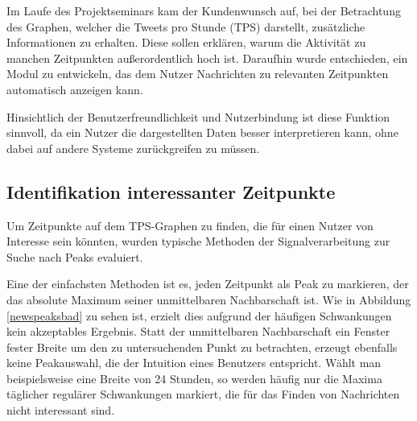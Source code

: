 \label{sec:news}
Im Laufe des Projektseminars kam der Kundenwunsch auf, bei der Betrachtung des Graphen, welcher die Tweets pro Stunde (TPS) darstellt, zusätzliche Informationen zu erhalten. Diese sollen erklären, warum die Aktivität zu manchen Zeitpunkten außerordentlich hoch ist. Daraufhin wurde entschieden, ein Modul zu entwickeln, das dem Nutzer Nachrichten zu relevanten Zeitpunkten automatisch anzeigen kann. 

Hinsichtlich der Benutzerfreundlichkeit und Nutzerbindung ist diese Funktion sinnvoll, da ein Nutzer die dargestellten Daten besser interpretieren kann, ohne dabei auf andere Systeme zurückgreifen zu müssen.

\subsection{Identifikation interessanter Zeitpunkte}
Um Zeitpunkte auf dem TPS-Graphen zu finden, die für einen Nutzer von Interesse sein könnten, wurden typische Methoden der Signalverarbeitung zur Suche nach Peaks evaluiert.

Eine der einfachsten Methoden ist es, jeden Zeitpunkt als Peak zu markieren, der das absolute Maximum seiner unmittelbaren Nachbarschaft ist. Wie in Abbildung \ref{newspeaksbad} zu sehen ist, erzielt dies aufgrund der häufigen Schwankungen kein akzeptables Ergebnis. Statt der unmittelbaren Nachbarschaft ein Fenster fester Breite um den zu untersuchenden Punkt zu betrachten, erzeugt ebenfalls keine Peakauswahl, die der Intuition eines Benutzers entspricht. Wählt man beispielsweise eine Breite von 24 Stunden, so werden häufig nur die Maxima täglicher regulärer Schwankungen markiert, die für das Finden von Nachrichten nicht interessant sind.


